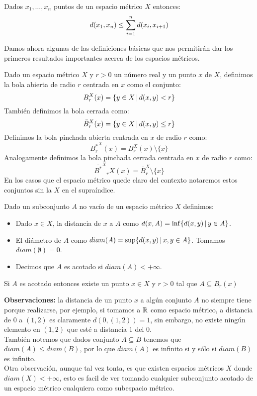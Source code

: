 \documentclass[12pt,a4paper]{book}
\begin{document}
\begin{ej}
Dados $x_1, \ldots , x_n$ puntos de un espacio métrico $X$ entonces:
$$ d(x_1 , x_n) \leq \sum_{{i} = 1}^{n} d(x_i,x_{i+1})$$
\end{ej}
Damos ahora algunas de las definiciones básicas que nos permitirán dar los primeros resultados importantes acerca de los espacios métricos.
\begin{defi} Dado un espacio métrico $X$ y $r > 0$ un número real y un punto $x$ de $X$, definimos la bola abierta de radio $r$ centrada en $x$ como el conjunto:
$$ B^X_r(x) = \{ y \in X \,\vert\, d(x,y)<r\}$$
También definimos la bola cerrada como:
$$ \bar{B}^X_r(x) = \{y \in X \,\vert\, d(x,y)\leq r\}$$
Definimos la bola pinchada abierta centrada en $x$ de radio $r$ como:
$$ {B_r^*}^X(x)= B^X_r(x) \setminus \{x\}$$
Analogamente definimos la bola pinchada cerrada centrada en $x$ de radio $r$ como:
$$ {\bar{B^*}^X}_rX(x) = \bar{B}^X_r \setminus \{x\} $$
En los casos que el espacio métrico quede claro del contexto notaremos estos conjuntos sin la $X$ en el supraíndice.
\end{defi}
\begin{defi} Dado un subconjunto $A$ no vacío de un espacio métrico $X$ definimos:
\begin{itemize}
\item Dado $x \in X$, la distancia de $x$ a $A$ como $d(x,A)= \inf\{d(x,y) \,\vert\, y \in A\}$.
\item El diámetro de $A$ como $diam(A)=\sup \{ d(x,y) \,\vert\, x,y \in A\}$. Tomamos $diam(\emptyset)=0$.
\item Decimos que $A$ es acotado si $diam(A) < +\infty$.
\end{itemize}
\end{defi}
\begin{ej} Si $A$ es acotado entonces existe un punto $x \in X$ y $r>0$ tal que $A \subseteq B_r(x)$\end{ej}
\textbf{Observaciones:} la distancia de un punto $x$ a algún conjunto $A$ no siempre tiene porque realizarse, por ejemplo, si tomamos a $\mathbb{R}$ como espacio métrico, a distancia de $0$ a $(1,2)$ es claramente $d(0,(1,2))=1$, sin embargo, no existe ningún elemento en $(1,2)$ que esté a distancia $1$ del $0$.\\
También notemos que dados conjunto $A \subseteq B$ tenemos que $diam(A) \leq diam(B)$, por lo que $diam(A)$ es infinito si y sólo si $diam(B)$ es infinito.\\
Otra observación, aunque tal vez tonta, es que existen espacios métricos $X$ donde $diam(X)<+\infty$, esto es facil de ver tomando cualquier subconjunto acotado de un espacio métrico cualquiera como subespacio métrico.\\[0.5cm]
\end{document}
